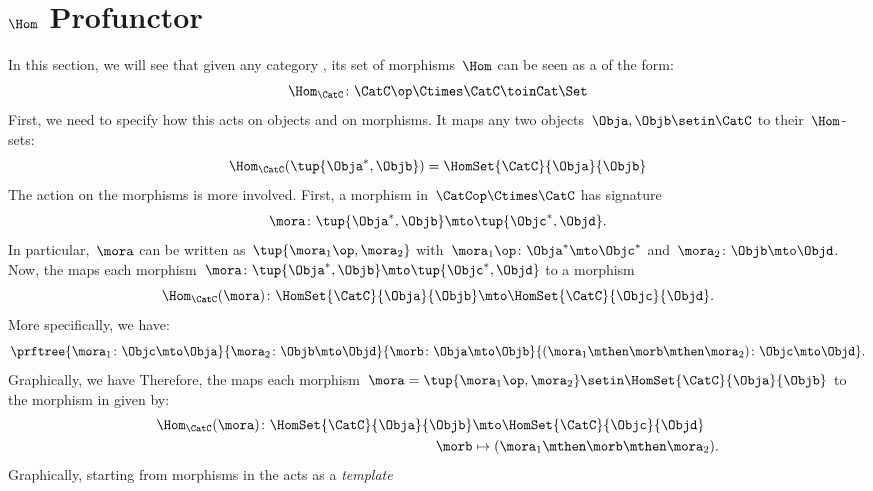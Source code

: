 
\section{$\Hom$ Profunctor}

In this section, we will see that given any category \CatC, its set of morphisms~$\Hom$ can be seen as a  of the form:
\begin{equation}
    \label{eq:hom-signature}
    \Hom_{\CatC}\colon \CatC \op \Ctimes \CatC \toinCat \Set
\end{equation}
First, we need to specify how this  acts on objects and on morphisms.
It maps any two objects~$\Obja,\Objb\setin \CatC$ to their~$\Hom$-sets:
\begin{equation}
    \label{eq:hom-action}
    \Hom_{\CatC}(\tup{\Obja^*,\Objb})=\HomSet{\CatC}{\Obja}{\Objb}
\end{equation}
The action on the morphisms is more involved.
First, a morphism in~$\CatCop \Ctimes \CatC$ has signature
%
\begin{equation}
    \label{eq:hom0}
    \mora \colon \tup{\Obja^*,\Objb}\mto \tup{\Objc^*, \Objd}.
\end{equation}
%
In particular,~$\mora$ can be written as~$\tup{\mora_1\op,\mora_2}$ with~$\mora_1\op\colon \Obja^*\mto \Objc^*$ and~$\mora_2\colon \Objb\mto \Objd$.
Now, the  maps each morphism~$\mora \colon \tup{\Obja^*,\Objb}\mto \tup{\Objc^*, \Objd}$ to a morphism
%
\begin{equation}
    \label{eq:hom2}
    \Hom_{\CatC}(\mora)\colon \HomSet{\CatC}{\Obja}{\Objb}\mto \HomSet{\CatC}{\Objc}{\Objd}.
\end{equation}
%
More specifically, we have:
%
\begin{equation}
    \label{eq:hom3}
    \prftree{
        \mora_1\colon \Objc \mto \Obja
    }{
        \mora_2\colon \Objb\mto \Objd
    }{
        \morb\colon \Obja\mto \Objb
    }{
        (\mora_1\mthen \morb \mthen \mora_2)\colon \Objc\mto \Objd
    }.
\end{equation}
%
Graphically, we have
%
Therefore, the  maps each morphism~$\mora=\tup{\mora_1\op,\mora_2}\setin \HomSet{\CatC}{\Obja}{\Objb}$ to the morphism in \Set given by:
%
\begin{equation}
    \label{eq:hom4}
    \begin{aligned}
        \Hom_{\CatC}(\mora)\colon \HomSet{\CatC}{\Obja}{\Objb} & \mto \HomSet{\CatC}{\Objc}{\Objd} \\
        \morb                                                  & \mapsto (\mora_1\mthen \morb \mthen \mora_2).
    \end{aligned}
\end{equation}
%
Graphically, starting from morphisms in \CatC
%
%
the  acts as a \emph{template}
%


